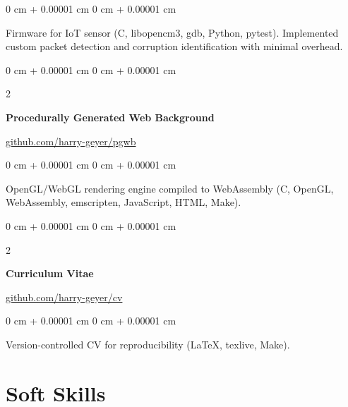 \documentclass[10pt, letterpaper]{article}
\newenvironment{onecolentry}{
    \begin{adjustwidth}{
        0 cm + 0.00001 cm
    }{
        0 cm + 0.00001 cm
    }
}{
    \end{adjustwidth}
}
\newenvironment{twocolentry}[2][]{
    \onecolentry
    \def\secondColumn{#2}
    \setcolumnwidth{\fill, 4.75 cm}
    \begin{paracol}{2}
}{
    \switchcolumn \raggedleft \secondColumn
    \end{paracol}
    \endonecolentry
}
\begin{document}
        \vspace{0.10 cm}
        \begin{onecolentry}
            Firmware for IoT sensor (C, libopencm3, gdb, Python, pytest). Implemented custom packet detection and corruption identification with minimal overhead.
        \end{onecolentry}

        \vspace{0.2 cm}

        \begin{twocolentry}{\href{https://github.com/harry-geyer/pgwb}{github.com/harry-geyer/pgwb}}
            \textbf{Procedurally Generated Web Background}
        \end{twocolentry}

        \vspace{0.10 cm}
        \begin{onecolentry}
            OpenGL/WebGL rendering engine compiled to WebAssembly (C, OpenGL, WebAssembly, emscripten, JavaScript, HTML, Make).
        \end{onecolentry}

        \vspace{0.2 cm}


        \begin{twocolentry}{\href{https://github.com/harry-geyer/cv}{github.com/harry-geyer/cv}}
            \textbf{Curriculum Vitae}
        \end{twocolentry}

        \vspace{0.10 cm}
        \begin{onecolentry}
            Version-controlled CV for reproducibility (LaTeX, texlive, Make).
        \end{onecolentry}

    \section{Soft Skills}
\end{document}
